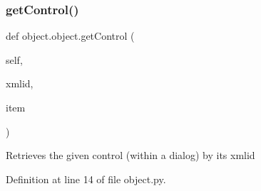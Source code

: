 \subsubsection{\texorpdfstring{get\+Control()}{getControl()}\hspace{0.1cm}{\footnotesize\ttfamily [1/2]}}
{\footnotesize\ttfamily def object.\+object.\+get\+Control (\begin{DoxyParamCaption}\item[{}]{self,  }\item[{}]{xmlid,  }\item[{}]{item }\end{DoxyParamCaption})\hspace{0.3cm}{\ttfamily [inherited]}}

\begin{DoxyVerb}Retrieves the given control (within a dialog) by its xmlid\end{DoxyVerb}
 

Definition at line 14 of file object.\+py.



